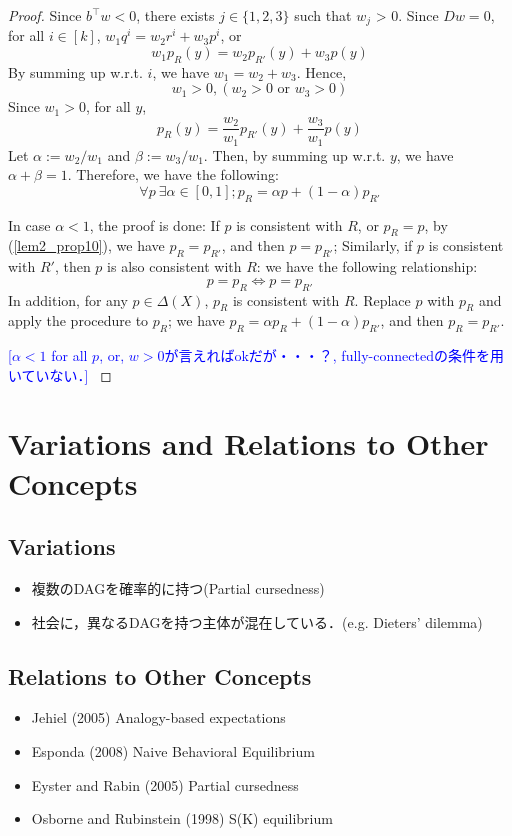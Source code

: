 \documentclass[11pt,a4paper,dvipdfmx]{article}
\theoremstyle{plain}
\newcommand{\equi}{\Longleftrightarrow}
\newcommand{\kcomment}[1]{{\textcolor{blue}{#1}}}
\begin{document}
\begin{proof}
	Since $b^\top w < 0$, there exists $j \in \{1,2,3\}$ such that $w_j$ > 0.
	Since $Dw=0$, for all $i \in [k]$, $w_1 q^i = w_2 r^i + w_3 p^i$, or
	\[
	w_1 p_R(y) = w_2 p_{R'}(y) + w_3 p(y)
	\]
	 By summing up w.r.t. $i$, we have $w_1 = w_2 + w_3$. Hence, 
	\[
	w_1 > 0, (w_2 > 0 \text{ or } w_3 > 0)
	\]
	Since $w_1>0$, for all $y$,
	\[
	p_R(y) = \frac{w_2}{w_1}p_{R'}(y) + \frac{w_3}{w_1}p(y)
	\]
	Let $\alpha := w_2 / w_1$ and $\beta := w_3 / w_1$. Then, by summing up w.r.t. $y$, we have $\alpha + \beta = 1$. Therefore, we have the following:
	\begin{equation}
		\forall p \ \exists \alpha \in [0,1]; p_R = \alpha p + (1 - \alpha)p_{R'} \label{lem2_prop10}
	\end{equation}
	
	In case $\alpha < 1$, the proof is done: If $p$ is consistent with $R$, or $p_R = p$, by (\ref{lem2_prop10}), we have $p_R = p_{R'}$, and then $p = p_{R'}$; Similarly, if $p$ is consistent with $R'$, then $p$ is also consistent with $R$: we have the following relationship:
	\[
	p = p_R \equi p = p_{R'} 
	\]
	In addition, for any $p \in \Delta(X)$, $p_R$ is consistent with $R$.
	Replace $p$ with $p_R$ and apply the procedure to $p_R$; we have
	$p_R = \alpha p_R + (1 - \alpha) p_{R'}$, and then $p_R = p_{R'}$.
	
	\kcomment{[$\alpha < 1$ for all $p$, or, $w>0$が言えればokだが・・・？, fully-connectedの条件を用いていない．]
	}

\end{proof}


\newpage
\section{Variations and Relations to Other Concepts}
\subsection{Variations}
\begin{itemize}
	\item 複数のDAGを確率的に持つ(Partial cursedness)
	\item 社会に，異なるDAGを持つ主体が混在している．(e.g. Dieters' dilemma)
\end{itemize}

\subsection{Relations to Other Concepts}
\begin{itemize}
	\item Jehiel (2005) Analogy-based expectations
	\item Esponda (2008) Naive Behavioral Equilibrium
	\item Eyster and Rabin (2005) Partial cursedness
	\item Osborne and Rubinstein (1998) S(K) equilibrium
\end{itemize}
\end{document}
